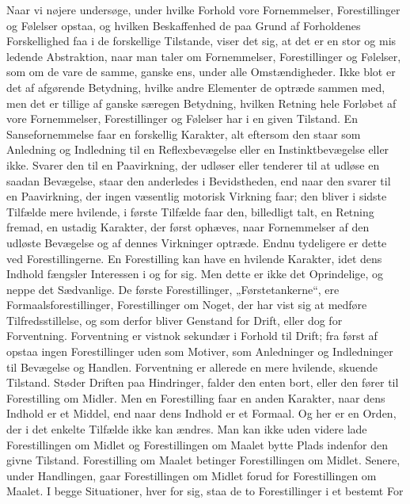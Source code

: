 \documentclass[12pt,a4paper,openany]{book}
\newcommand{\opage}[1]{\marginnote{\footnotesize\textit{[#1]}}}
\begin{document}
Naar vi nøjere undersøge, under hvilke Forhold vore
Fornemmelser, Forestillinger og Følelser opstaa, og hvilken Beskaffenhed
de paa Grund af Forholdenes Forskellighed faa i de
forskellige Tilstande, viser det sig, at det er en stor og mis%
\setcounter{footnote}{0}%
\opage{48}ledende Abstraktion, naar man taler om Fornemmelser, Forestillinger
og Følelser, som om de vare de samme, ganske ens,
under alle Omstændigheder. Ikke blot er det af afgørende Betydning,
hvilke andre Elementer de optræde sammen med, men
det er tillige af ganske særegen Betydning, hvilken Retning
hele Forløbet af vore Fornemmelser, Forestillinger og Følelser
har i en given Tilstand. En Sansefornemmelse faar en forskellig
Karakter, alt eftersom den staar som Anledning og Indledning
til en Reflexbevægelse eller en Instinktbevægelse eller
ikke. Svarer den til en Paavirkning, der udløser eller tenderer
til at udløse en saadan Bevægelse, staar den anderledes i Bevidstheden,
end naar den svarer til en Paavirkning, der ingen
væsentlig motorisk Virkning faar; den bliver i sidste Tilfælde
mere hvilende, i første Tilfælde faar den, billedligt talt, en Retning
fremad, en ustadig Karakter, der først ophæves, naar Fornemmelser
af den udløste Bevægelse og af dennes Virkninger
optræde. Endnu tydeligere er dette ved Forestillingerne. En
Forestilling kan have en hvilende Karakter, idet dens Indhold
fængsler Interessen i og for sig. Men dette er ikke det Oprindelige,
og neppe det Sædvanlige. De første Forestillinger,
„Førstetankerne“, ere Formaalsforestillinger, Forestillinger om
Noget, der har vist sig at medføre Tilfredsstillelse, og som derfor
bliver Genstand for Drift, eller dog for Forventning. Forventning
er vistnok sekundær i Forhold til Drift; fra først af
opstaa ingen Forestillinger uden som Motiver, som Anledninger
og Indledninger til Bevægelse og Handlen. Forventning er allerede
en mere hvilende, skuende Tilstand. Støder Driften paa
Hindringer, falder den enten bort, eller den fører til Forestilling
om Midler. Men en Forestilling faar en anden Karakter, naar
dens Indhold er et Middel, end naar dens Indhold er et Formaal.
Og her er en Orden, der i det enkelte Tilfælde ikke
kan ændres. Man kan ikke uden videre lade Forestillingen
om Midlet og Forestillingen om Maalet bytte Plads indenfor
den givne Tilstand. Forestilling om Maalet betinger Forestillingen
om Midlet. Senere, under Handlingen, gaar Forestillingen
om Midlet forud for Forestillingen om Maalet. I begge Situationer,
hver for sig, staa de to Forestillinger i et bestemt For%
\end{document}
